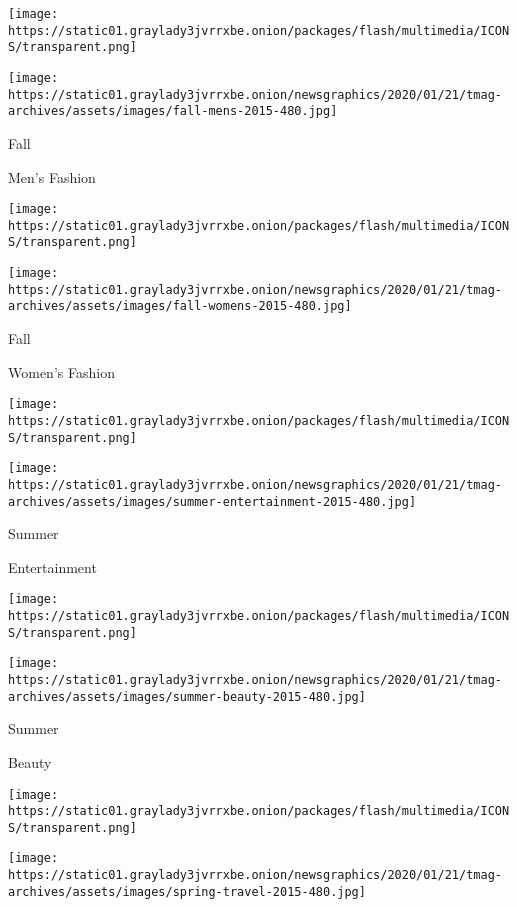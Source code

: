 \texttt{[image: https://static01.graylady3jvrrxbe.onion/packages/flash/multimedia/ICONS/transparent.png]}

\texttt{[image: https://static01.graylady3jvrrxbe.onion/newsgraphics/2020/01/21/tmag-archives/assets/images/fall-mens-2015-480.jpg]}

Fall

Men's Fashion

\href{https://www.nytimes3xbfgragh.onion/interactive/2015/08/23/t-magazine/fall-womens-fashion-issue-collection.html}{}

\texttt{[image: https://static01.graylady3jvrrxbe.onion/packages/flash/multimedia/ICONS/transparent.png]}

\texttt{[image: https://static01.graylady3jvrrxbe.onion/newsgraphics/2020/01/21/tmag-archives/assets/images/fall-womens-2015-480.jpg]}

Fall

Women's Fashion

\href{https://www.nytimes3xbfgragh.onion/indexes/2015/07/19/t-magazine/design-issue/index.html}{}

\texttt{[image: https://static01.graylady3jvrrxbe.onion/packages/flash/multimedia/ICONS/transparent.png]}

\texttt{[image: https://static01.graylady3jvrrxbe.onion/newsgraphics/2020/01/21/tmag-archives/assets/images/summer-entertainment-2015-480.jpg]}

Summer

Entertainment

\href{https://www.nytimes3xbfgragh.onion/indexes/2015/06/14/t-magazine/womens-fashion-issue/index.html}{}

\texttt{[image: https://static01.graylady3jvrrxbe.onion/packages/flash/multimedia/ICONS/transparent.png]}

\texttt{[image: https://static01.graylady3jvrrxbe.onion/newsgraphics/2020/01/21/tmag-archives/assets/images/summer-beauty-2015-480.jpg]}

Summer

Beauty

\href{https://www.nytimes3xbfgragh.onion/indexes/2015/05/17/t-magazine/travel-issue/index.html}{}

\texttt{[image: https://static01.graylady3jvrrxbe.onion/packages/flash/multimedia/ICONS/transparent.png]}

\texttt{[image: https://static01.graylady3jvrrxbe.onion/newsgraphics/2020/01/21/tmag-archives/assets/images/spring-travel-2015-480.jpg]}


